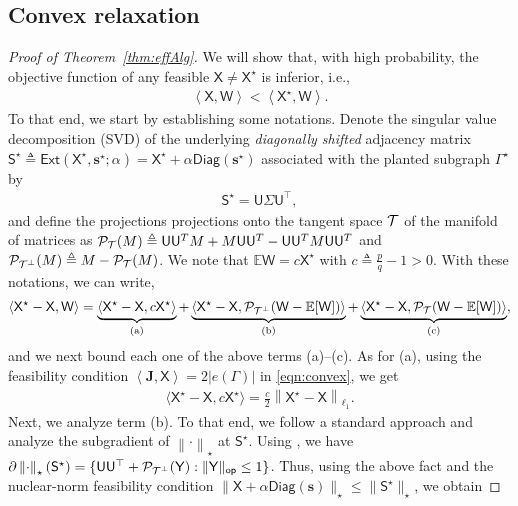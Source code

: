 \documentclass[12pt]{article}
\newcommand{\bE}{\mathbb{E}}
\newcommand{\Jb}{\mathbf{J}}
\newcommand{\calP}{{\cal P}}
\newcommand{\calT}{{\cal T}}
\newcommand{\norm}[1]{\left\|#1\right\|}
\newcommand{\innerP}[1]{\left\langle#1\right\rangle}
\newcommand{\s}[1]{\mathsf{#1}}
\begin{document}
\subsection{Convex relaxation}\label{sec:upperbounds_conv}

\begin{proof}[Proof of Theorem~\ref{thm:effAlg}]
We will show that, with high probability, the objective function of any feasible $\s{X}\neq\s{X}^\star$ is inferior, i.e.,
\begin{align}
    \innerP{\s{X},\s{W}} < \innerP{\s{X}^\star,\s{W}}.
\end{align}
To that end, we start by establishing some notations. Denote the singular value decomposition (SVD) of the underlying \emph{diagonally shifted} adjacency matrix $\s{S}^\star\triangleq\s{Ext}(\s{X}^\star,\mathbf{s}^\star;\alpha) = \s{X}^\star + \alpha\s{Diag}(\mathbf{s}^\star)$ associated with the planted subgraph $\Gamma^\star$ by
\begin{align}
\s{S}^\star = \s{U}\Sigma \s{U}^\top,
\end{align}
and define the projections projections onto the tangent space $\calT$ of the manifold of matrices as $\calP_{\calT}(M)\triangleq \s{U}\s{U}^TM+M\s{U}\s{U}^T-\s{U}\s{U}^TM\s{U}\s{U}^T$ and $\calP_{\calT^\perp}(M)\triangleq M-\calP_{\calT}(M)$. We note that $\bE\s{W} = c\s{X}^\star$ with $c\triangleq \frac{p}{q}-1>0$. With these notations, we can write,
\begin{align}
    \innerP{\s{X}^\star-\s{X},\s{W}} = \underbrace{\langle \s{X}^\star - \s{X}, c\s{X}^\star \rangle}_{\text{(a)}}
+ \underbrace{\langle \s{X}^\star - \s{X}, \calP_{\calT^\perp}(\s{W} - \bE[\s{W}]) \rangle}_{\text{(b)}}
+ \underbrace{\langle \s{X}^\star - \s{X}, \calP_{\calT}(\s{W} - \bE[\s{W}]) \rangle}_{\text{(c)}},
\end{align}
and we next bound each one of the above terms (a)--(c). As for (a), using the feasibility condition $\innerP{\Jb,\s{X}}=2|e(\Gamma)|$ in \eqref{eqn:convex}, we get
\begin{align}
    \langle \s{X}^\star - \s{X}, c\s{X}^\star \rangle = \frac{c}{2}\norm{\s{X}^\star - \s{X}}_{\ell_1}.
\end{align}
Next, we analyze term (b). To that end, we follow a standard approach and analyze the subgradient of $\norm{\cdot}_{\star}$ at $\s{S}^\star$. Using \cite[Corollary 6.1]{chen2016statistical}, we have $\partial \norm{\cdot}_{\star}(\s{S}^\star) = \{\s{U}\s{U}^\top + \calP_{\calT^\perp}(\s{Y}) : \|\s{Y}\|_{\s{op}} \leq 1\}$.
Thus, using the above fact and the nuclear-norm feasibility condition $\|\s{X}+\alpha\s{Diag}(\mathbf{s})\|_\star\leq \|\s{S}^\star\|_\star$, we obtain

\end{proof}
\end{document}
